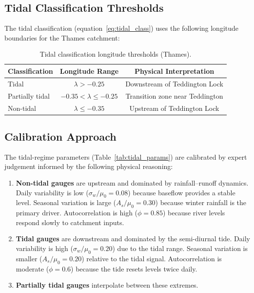 \documentclass[11pt,a4paper]{article}
\begin{document}
\subsection{Tidal Classification Thresholds}

The tidal classification (equation~\ref{eq:tidal_class}) uses the following longitude
boundaries for the Thames catchment:

\begin{table}[H]
    \centering
    \caption{Tidal classification longitude thresholds (Thames).}
    \label{tab:tidal_thresholds}
    \begin{tabular}{lcc}
        \toprule
        \textbf{Classification} & \textbf{Longitude Range} & \textbf{Physical Interpretation} \\
        \midrule
        Tidal           & $\lambda > -0.25$         & Downstream of Teddington Lock \\
        Partially tidal & $-0.35 < \lambda \le -0.25$ & Transition zone near Teddington \\
        Non-tidal       & $\lambda \le -0.35$       & Upstream of Teddington Lock \\
        \bottomrule
    \end{tabular}
\end{table}

\subsection{Calibration Approach}

The tidal-regime parameters (Table~\ref{tab:tidal_params}) are calibrated by expert
judgement informed by the following physical reasoning:

\begin{enumerate}[nosep]
    \item \textbf{Non-tidal gauges} are upstream and dominated by rainfall--runoff
          dynamics. Daily variability is low ($\sigma_w / \mu_0 = 0.08$) because
          baseflow provides a stable level. Seasonal variation is large ($A_s / \mu_0 = 0.30$)
          because winter rainfall is the primary driver. Autocorrelation is high
          ($\phi = 0.85$) because river levels respond slowly to catchment inputs.
    \item \textbf{Tidal gauges} are downstream and dominated by the semi-diurnal tide.
          Daily variability is high ($\sigma_w / \mu_0 = 0.20$) due to the tidal range.
          Seasonal variation is smaller ($A_s / \mu_0 = 0.20$) relative to the tidal
          signal. Autocorrelation is moderate ($\phi = 0.6$) because the tide resets
          levels twice daily.
    \item \textbf{Partially tidal gauges} interpolate between these extremes.
\end{enumerate}
\end{document}
